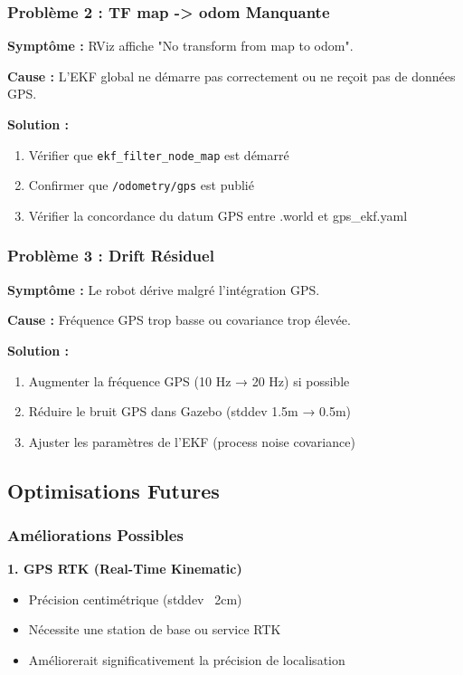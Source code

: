 \documentclass[a4paper,12pt]{article}
\begin{document}
\subsubsection{Problème 2 : TF map -> odom Manquante}

\textbf{Symptôme :} RViz affiche "No transform from map to odom".

\textbf{Cause :} L'EKF global ne démarre pas correctement ou ne reçoit pas de données GPS.

\textbf{Solution :}
\begin{enumerate}
    \item Vérifier que \texttt{ekf\_filter\_node\_map} est démarré
    \item Confirmer que \texttt{/odometry/gps} est publié
    \item Vérifier la concordance du datum GPS entre .world et gps\_ekf.yaml
\end{enumerate}

\subsubsection{Problème 3 : Drift Résiduel}

\textbf{Symptôme :} Le robot dérive malgré l'intégration GPS.

\textbf{Cause :} Fréquence GPS trop basse ou covariance trop élevée.

\textbf{Solution :}
\begin{enumerate}
    \item Augmenter la fréquence GPS (10 Hz → 20 Hz) si possible
    \item Réduire le bruit GPS dans Gazebo (stddev 1.5m → 0.5m)
    \item Ajuster les paramètres de l'EKF (process noise covariance)
\end{enumerate}

\subsection{Optimisations Futures}

\subsubsection{Améliorations Possibles}

\textbf{1. GPS RTK (Real-Time Kinematic)}
\begin{itemize}
    \item Précision centimétrique (stddev ~2cm)
    \item Nécessite une station de base ou service RTK
    \item Améliorerait significativement la précision de localisation
\end{itemize}
\end{document}
